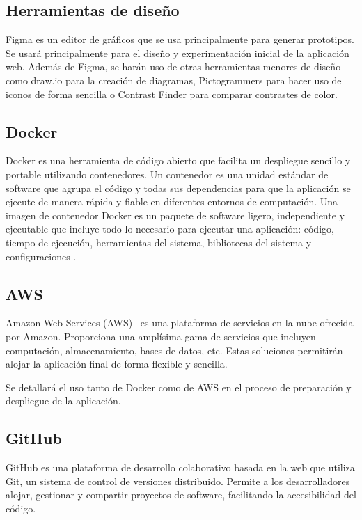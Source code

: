 \subsection{Herramientas de diseño}

Figma \cite{figma} es un editor de gráficos que se usa principalmente para generar prototipos. Se usará principalmente para
el diseño y experimentación inicial de la aplicación web. Además de Figma, se harán uso de otras herramientas
menores de diseño como draw.io \cite{draw.io} para la creación de diagramas, Pictogrammers \cite{pictogrammers} para hacer uso de
iconos de forma sencilla o Contrast Finder \cite{contrastFinder} para comparar contrastes de color.

\subsection{Docker}

Docker \cite{docker} es una herramienta de código abierto que facilita un despliegue sencillo y portable utilizando contenedores. 
Un contenedor es una unidad estándar de software que agrupa el código y todas sus dependencias para que la aplicación se ejecute de 
manera rápida y fiable en diferentes entornos de computación. Una imagen de contenedor Docker es un paquete de software ligero,
independiente y ejecutable que incluye todo lo necesario para ejecutar una aplicación: código, tiempo de ejecución, 
herramientas del sistema, bibliotecas del sistema y configuraciones \cite{dockerContainer}.

\subsection{AWS}

Amazon Web Services (AWS)~\cite{aws} es una plataforma de servicios en la nube ofrecida por Amazon. Proporciona
una amplísima gama de servicios que incluyen computación, almacenamiento, bases de datos, etc. Estas soluciones permitirán
alojar la aplicación final de forma flexible y sencilla.

Se detallará el uso tanto de Docker como de AWS en el proceso de preparación y despliegue de la aplicación.

\subsection{GitHub}

GitHub \cite{github} es una plataforma de desarrollo colaborativo basada en la web que utiliza Git, un sistema de control de versiones
distribuido. Permite a los desarrolladores alojar, gestionar y compartir proyectos de software, facilitando la accesibilidad
del código.

